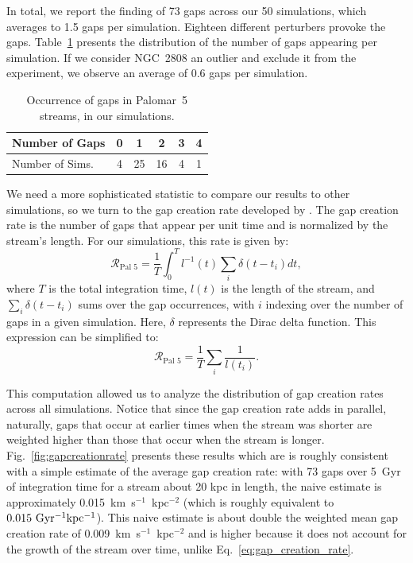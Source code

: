         In total, we report the finding of 73 gaps across our 50 simulations, which averages to 1.5 gaps per simulation. Eighteen different perturbers provoke the gaps. Table~\ref{table:gap_distribution} presents the distribution of the number of gaps appearing per simulation. If we consider NGC~2808 an outlier and exclude it from the experiment, we observe an average of 0.6 gaps per simulation.  

        \begin{table}[h]
            \centering
            \caption{Occurrence of gaps in Palomar~5 streams, in our simulations.}\label{table:gap_distribution}
            \begin{tabular}{|l|c|c|c|c|c|}
                \hline
                Number of Gaps & 0 & 1 & 2 & 3 & 4 \\
                \hline
                Number of Sims. & 4 & 25 & 16 & 4 & 1 \\
                \hline
            \end{tabular}
            \vspace{0.5cm}
        \end{table}

    We need a more sophisticated statistic to compare our results to other simulations, so we turn to the gap creation rate developed by \citet{2012ApJ...748...20C}. The gap creation rate is the number of gaps that appear per unit time and is normalized by the stream's length. For our simulations, this rate is given by: \begin{equation} \label{eq:gap_creation_rate} \mathcal{R}_{\textrm{Pal 5}} =  \frac{1}{T}\int_{0}^T l^{-1}(t) \sum_i \delta(t-t_i) dt,\end{equation}where $T$ is the total integration time, $l(t)$ is the length of the stream, and $\sum_i \delta(t-t_i)$ sums over the gap occurrences, with $i$ indexing over the number of gaps in a given simulation. Here, $\delta$ represents the Dirac delta function. This expression can be simplified to:\begin{equation}\mathcal{R}_{\textrm{Pal 5}} =  \frac{1}{T} \sum_i \frac{1}{l (t_i)}. \end{equation}
    
    This computation allowed us to analyze the distribution of gap creation rates across all simulations. Notice that since the gap creation rate adds in parallel, naturally, gaps that occur at earlier times when the stream was shorter are weighted higher than those that occur when the stream is longer. Fig.~\ref{fig:gapcreationrate} presents these results which are is roughly consistent with a simple estimate of the average gap creation rate: with 73 gaps over 5~Gyr of integration time for a stream about 20 kpc in length, the naive estimate is approximately 0.015~km~s$^{-1}$~kpc$^{-2} $ (which is roughly equivalent to $0.015~\rm{Gyr^{-1}kpc^{-1}}$). This naive estimate is about double the weighted mean gap creation rate of 0.009~km~s$^{-1}$~kpc$^{-2}$ and is higher because it does not account for the growth of the stream over time, unlike Eq.~\ref{eq:gap_creation_rate}.

